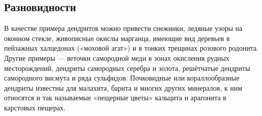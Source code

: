 \subsection{Разновидности}
В качестве примера дендритов можно привести снежинки, ледяные узоры на оконном стекле, живописные окислы марганца, имеющие вид деревьев в пейзажных халцедонах («моховой агат») и в тонких трещинах розового родонита. Другие примеры — веточки самородной меди в зонах окисления рудных месторождений, дендриты самородных серебра и золота, решётчатые дендриты самородного висмута и ряда сульфидов. Почковидные или кораллообразные дендриты известны для малахита, барита и многих других минералов, к ним относятся и так называемые «пещерные цветы» кальцита и арагонита в карстовых пещерах.